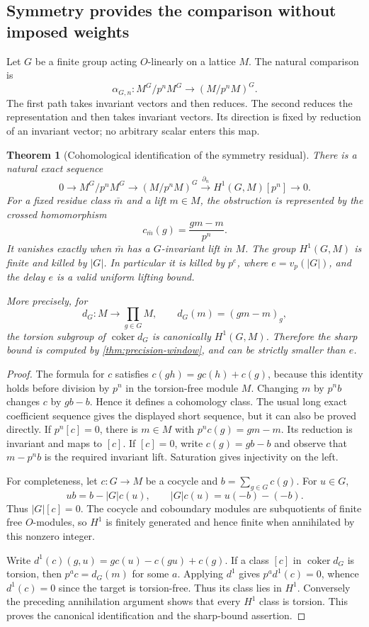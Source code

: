\documentclass[11pt]{article}
\newtheorem{theorem}{Theorem}[section]
\theoremstyle{definition}
\theoremstyle{remark}
\begin{document}
\subsection{Symmetry provides the comparison without imposed weights}

Let $G$ be a finite group acting $O$-linearly on a lattice $M$. The natural comparison is
\[
 \alpha_{G,n}:M^G/p^nM^G\longrightarrow(M/p^nM)^G.
\]
The first path takes invariant vectors and then reduces. The second reduces the representation and then takes invariant vectors. Its direction is fixed by reduction of an invariant vector; no arbitrary scalar enters this map.

\begin{theorem}[Cohomological identification of the symmetry residual]\label{thm:invariant-bockstein}
There is a natural exact sequence
\[
 \boxed{0\longrightarrow M^G/p^nM^G\longrightarrow(M/p^nM)^G
 \xrightarrow{\partial_n}H^1(G,M)[p^n]\longrightarrow0.}
\]
For a fixed residue class $\bar m$ and a lift $m\in M$, the obstruction is represented by the crossed homomorphism
\[
 c_{\bar m}(g)=\frac{gm-m}{p^n}.
\]
It vanishes exactly when $\bar m$ has a $G$-invariant lift in $M$. The group $H^1(G,M)$ is finite and killed by $|G|$. In particular it is killed by $p^e$, where $e=v_p(|G|)$, and the delay $e$ is a valid uniform lifting bound.

More precisely, for
\[
 d_G:M\longrightarrow\prod_{g\in G}M,\qquad
 d_G(m)=(gm-m)_g,
\]
the torsion subgroup of $\operatorname{coker}d_G$ is canonically $H^1(G,M)$. Therefore the sharp bound is computed by \cref{thm:precision-window}, and can be strictly smaller than $e$.
\end{theorem}
\begin{proof}
The formula for $c$ satisfies $c(gh)=g c(h)+c(g)$, because this identity holds before division by $p^n$ in the torsion-free module $M$. Changing $m$ by $p^n b$ changes $c$ by $g b-b$. Hence it defines a cohomology class. The usual long exact coefficient sequence gives the displayed short sequence, but it can also be proved directly. If $p^n[c]=0$, there is $m\in M$ with $p^n c(g)=gm-m$. Its reduction is invariant and maps to $[c]$. If $[c]=0$, write $c(g)=g b-b$ and observe that $m-p^n b$ is the required invariant lift. Saturation gives injectivity on the left.

For completeness, let $c:G\to M$ be a cocycle and $b=\sum_{g\in G}c(g)$. For $u\in G$,
\[
 ub=b-|G|c(u),\qquad |G|c(u)=u(-b)-(-b).
\]
Thus $|G|[c]=0$. The cocycle and coboundary modules are subquotients of finite free $O$-modules, so $H^1$ is finitely generated and hence finite when annihilated by this nonzero integer.

Write $d^1(c)(g,u)=g c(u)-c(gu)+c(g)$. If a class $[c]$ in $\operatorname{coker}d_G$ is torsion, then $p^a c=d_G(m)$ for some $a$. Applying $d^1$ gives $p^a d^1(c)=0$, whence $d^1(c)=0$ since the target is torsion-free. Thus its class lies in $H^1$. Conversely the preceding annihilation argument shows that every $H^1$ class is torsion. This proves the canonical identification and the sharp-bound assertion.
\end{proof}
\end{document}
